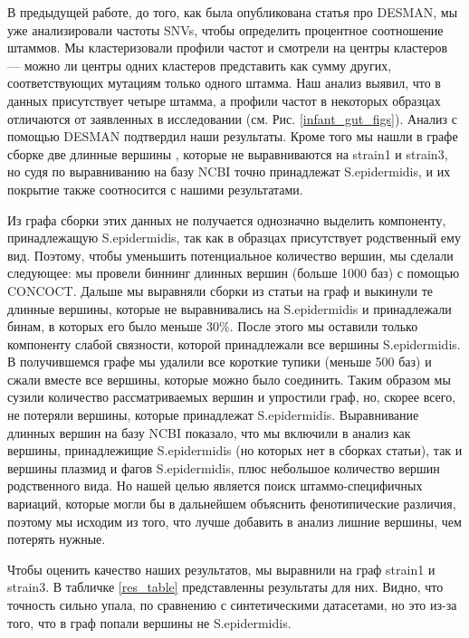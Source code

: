 \documentclass{spbau-diploma}
\begin{document}
В предыдущей работе, до того, как была опубликована статья про DESMAN, мы уже анализировали частоты SNVs, чтобы определить процентное соотношение штаммов. Мы кластеризовали профили частот и смотрели на центры кластеров --- можно ли центры одних кластеров представить как сумму других, соответствующих мутациям только одного штамма. Наш анализ выявил, что в данных присутствует четыре штамма, а профили частот в некоторых образцах отличаются от заявленных в исследовании (см. Рис. \ref{infant_gut_figs}). Анализ с помощью DESMAN подтвердил наши результаты. Кроме того мы нашли в графе сборке две длинные вершины , которые не выравниваются на strain1 и strain3, но судя по выравниванию на базу NCBI точно принадлежат S.epidermidis, и их покрытие также соотносится с нашими результатами.

Из графа сборки этих данных не получается однозначно выделить компоненту, принадлежащую S.epidermidis, так как в образцах присутствует родственный ему вид. Поэтому, чтобы уменьшить потенциальное количество вершин, мы сделали следующее: мы провели биннинг длинных вершин (больше 1000 баз) с помощью CONCOCT. Дальше мы выравняли сборки из статьи на граф и выкинули те длинные вершины, которые не выравнивались на S.epidermidis и принадлежали бинам, в которых его было меньше 30\%. После этого мы оставили только компоненту слабой связности, которой принадлежали все вершины S.epidermidis. В получившемся графе мы удалили все короткие тупики (меньше 500 баз) и сжали вместе все вершины, которые можно было соединить. Таким образом мы сузили количество рассматриваемых вершин и упростили граф, но, скорее всего, не потеряли вершины, которые принадлежат S.epidermidis. Выравнивание длинных вершин на базу NCBI показало, что мы включили в анализ как вершины, принадлежищие S.epidermidis (но которых нет в сборках статьи), так и вершины плазмид и фагов S.epidermidis, плюс небольшое количество вершин родственного вида. Но нашей целью является поиск штаммо-специфичных вариаций, которые могли бы в дальнейшем объяснить фенотипические различия, поэтому мы исходим из того, что лучше добавить в анализ лишние вершины, чем потерять нужные.

Чтобы оценить качество наших результатов, мы выравнили на граф strain1 и strain3. В табличке \ref{res_table} представленны результаты для них. Видно, что точность сильно упала, по сравнению с синтетическими датасетами, но это из-за того, что в граф попали вершины не S.epidermidis. 
\end{document}
